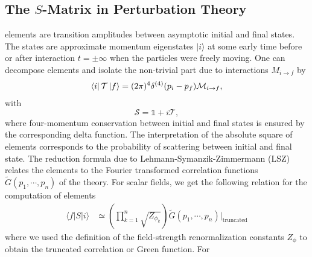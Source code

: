 \subsection{The $S$-Matrix in Perturbation Theory}
\label{sec:s-matr-pert}
\sma{} elements are transition amplitudes between asymptotic initial and final
states. The states are approximate momentum
eigenstates $|i\rangle$ at some early time before or after interaction
\mbox{$t = \pm\infty$} when the particles were freely moving. 
One can decompose \sma{} elements and isolate the non-trivial part due to interactions 
${M}_{i\to f}$ by
\begin{align} \label{eq:matrix_element}
  \bra{i}{\mathcal{T}}\ket{f} =  (2\pi)^4 \delta^{(4)}(p_i- p_f) \mathcal{M}_{i\to f},
\end{align}
with
\begin{equation} \label{eq:tmatrix}
  \mathcal{S} = \mathbb{1}+i \mathcal{T},
\end{equation}
where four-momentum conservation between initial and
final states is ensured by the corresponding delta function. The
interpretation of the absolute square of \sma{} elements corresponds
to the probability of scattering between initial and final state.
The reduction formula due to Lehmann-Symanzik-Zimmermann (LSZ)
\cite{Lehmann:1954rq} relates the \sma{} elements to the Fourier
transformed correlation functions $\widetilde{G}(p_1,\cdots,p_n)$ of the theory. For
scalar fields, we get the following relation for the computation of \sma{} elements
\begin{align}
 \langle f | S | i \rangle &\simeq 
 \left(\prod_{k=1}^n{\sqrt{Z_{\phi_k}}} \right)
\widetilde{G}(p_1,\cdots,p_n)\rvert_{\text{truncated}}
\end{align}
where we used the definition of the field-strength renormalization
constants $Z_{\phi}$ to obtain the truncated correlation or Green
function. For
